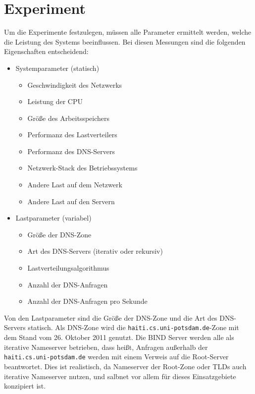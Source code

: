 \documentclass[a4paper, 12pt, BCOR10mm, DIV12, toc=bibliography, toc=listof, german]{scrbook}
\begin{document}

		\section{Experiment} %
		\label{sec:experiment}

			Um die Experimente festzulegen, müssen alle Parameter ermittelt werden, welche die Leistung
			des Systems beeinflussen. Bei diesen Messungen sind die folgenden Eigenschaften entscheidend:

			\begin{itemize}
				\item Systemparameter (statisch)
					\begin{itemize}
						\item Geschwindigkeit des Netzwerks
						\item Leistung der CPU
						\item Größe des Arbeitsspeichers
						\item Performanz des Lastverteilers
						\item Performanz des DNS-Servers
						\item Netzwerk-Stack des Betriebssystems
						\item Andere Last auf dem Netzwerk
						\item Andere Last auf den Servern
					\end{itemize}
				\item Lastparameter (variabel)
					\begin{itemize}
						\item Größe der DNS-Zone
						\item Art des DNS-Servers (iterativ oder rekursiv)
						\item Lastverteilungsalgorithmus
						\item Anzahl der DNS-Anfragen
						\item Anzahl der DNS-Anfragen pro Sekunde
					\end{itemize}
			\end{itemize}

			Von den Lastparameter sind die Größe der DNS-Zone und die Art des DNS-Servers statisch. Als
			DNS-Zone wird die \texttt{haiti.cs.uni-potsdam.de}-Zone mit dem Stand vom 26.  Oktober 2011
			genutzt. Die BIND Server werden alle als iterative Nameserver betrieben, dass heißt, Anfragen
			außerhalb der \texttt{haiti.cs.uni-potsdam.de} werden mit einem Verweis auf die Root-Server
			beantwortet. Dies ist realistisch, da Nameserver der Root-Zone oder TLDs auch iterative
			Nameserver nutzen, und salbnet vor allem für dieses Einsatzgebiete konzipiert ist.
\end{document}
